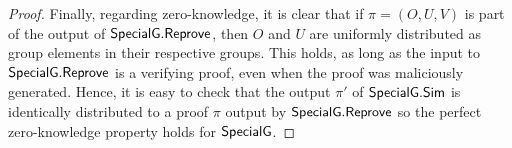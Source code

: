 \begin{proof}
\noindent Finally, regarding zero-knowledge, it is clear that if $\pi = (O, U, V)$ is part of the output of ${\mathsf{SpecialG}}.{\mathsf{Reprove}}$, 
then $O$ and $U$ are uniformly distributed as group elements in their respective groups. This holds, as long as the 
input to ${\mathsf{SpecialG}}.{\mathsf{Reprove}}$ is a verifying proof, even when the proof was maliciously generated. Hence, it is easy to check  
that the output $\pi'$ of ${\mathsf{SpecialG}}.{\mathsf{Sim}}$ is identically distributed to a proof $\pi$ output by ${\mathsf{SpecialG}}.{\mathsf{Reprove}}$ so the perfect 
zero-knowledge property holds for ${\mathsf{SpecialG}}$. 
\end{proof}


